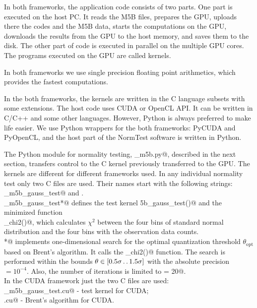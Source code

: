 \documentclass[letterpaper,twoside,12pt]{article}
\newcommand{\twodots}{\mathinner {\ldotp \ldotp}}
\begin{document}
In both frameworks, the application code consists of two parts. One part is executed on the host PC. It reads the M5B files, prepares the GPU, uploads there the codes and the M5B data, starts the computations on the GPU, downloads the results from the GPU to the host memory, and saves them to the disk. The other part of code is executed in parallel on the multiple GPU cores. The programs executed on the GPU are called kernels. 

In both frameworks we use single precision floating point arithmetics, which provides the fastest computations.

In the both frameworks, the kernels are written in the C language subsets with some extensions. The host code uses CUDA or OpenCL API. It can be written in C/C++ and some other languages. However, Python is always preferred to make life easier. We use Python wrappers for the both frameworks: PyCUDA and PyOpenCL, and the host part of the NormTest software is written in Python. 

The Python module for normality testing, \verb@gpu_m5b.py@, described in the next section, transfers control to the C kernel previously transferred to the GPU. The kernels are different for different frameworks used. In any individual normality test only two C files are used. Their names start with the following strings: \verb@ker_m5b_gauss_test@ and \verb@fminbndf@. \\

\noindent \verb@ker_m5b_gauss_test*@ defines the test kernel \verb@m5b_gauss_test()@ and the minimized function  \\
\hangindent=0.7cm \verb@calc_chi2()@, which calculates $\chi^2$ between the four bins of standard normal distribution and the four bins with the observation data counts. \\

\noindent \verb@fminbndf*@ implements one-dimensional search for the optimal quantization threshold $\theta_\text{opt}$  \\
\hangindent=0.7cm based on Brent's algorithm. It calls the \verb@calc_chi2()@ function. The search is performed within the bounds $\theta \in [0.5\sigma \twodots 1.5\sigma]$ with the absolute precision \verb@atol@ $=10^{-4}$. Also, the number of iterations is limited to  \verb@maxiter = 20@. \\


In the CUDA framework just the two C files are used: \\

\noindent \verb@ker_m5b_gauss_test.cu@  - test kernel for CUDA; \\
\noindent \verb@fminbndf.cu@ - Brent's algorithm for CUDA. \\
\end{document}
